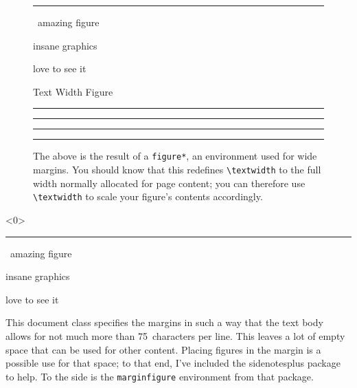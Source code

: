 \begin{chapterpage}
  \vfill
  \begin{figure}[h]
    \hrulefill\vskip1pt%
    {\color{gray5}\rule{\linewidth}{+0.4cm\relax}}%
    \vspace*{\dimexpr-47pt-0.4cm\relax}

    {\color{white}
    \ amazing figure\hfill\vskip0.2cm{\centering insane graphics\par}\vskip0.2cm\hfill love to see it\ \hbox{}\vskip1pt}\hrulefill
    \caption[Text Width Figure]{\color{gray3}Text Width Figure}
  \end{figure}
\end{chapterpage}


\begin{figure}[t]%
  {\color{gray9}
  \rule{\textwidth\relax}{30ex}\hfill\color{gray7}
  \rule{\textwidth\relax}{30ex}\hfill\color{gray5}
  \rule{\textwidth\relax}{30ex}\hfill\color{gray3}
  \rule{\textwidth\relax}{30ex}%
}
  \vskip1pt
  \hrulefill
  \caption{The above is the result of a \texttt{figure*}, an environment used for wide margins.
You should know that this redefines \texttt{\textbackslash textwidth} to the full width normally allocated for page content; you can therefore use \texttt{\textbackslash textwidth} to scale your figure's contents accordingly.}
\end{figure}

\begin{marginfigure}<0\baselineskip>
  \hrulefill\vskip1pt%
  {\color{gray8}\rule{\textwidth}{+5cm\relax}}%
  \vspace*{\dimexpr-51pt-5cm\relax}

  \ amazing figure\hfill\vskip2.5cm{\centering insane graphics\par}\vskip2.5cm\hfill love to see it\ \hbox{}\vskip-6pt\hrulefill
\end{marginfigure}

\noindent
This document class specifies the margins in such a way that the text body allows for not much more than 75~characters per line.
This leaves a lot of empty space that can be used for other content.
Placing figures in the margin is a possible use for that space; to that end, I've included the \textsf{sidenotesplus} package to help.
To the side is the \texttt{marginfigure} environment from that package.

